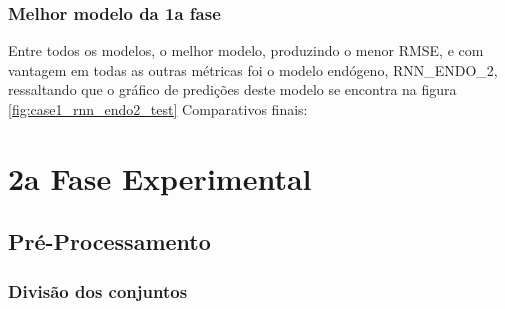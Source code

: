 \documentclass[	12pt, Times, openright, twoside, a4paper, english, brazil]{abntex2}
\begin{document}
    	    \subsubsection{Melhor modelo da 1a fase}
                Entre todos os modelos, o melhor modelo, produzindo o menor RMSE, e com vantagem em todas as outras métricas foi o modelo endógeno, RNN\_ENDO\_2, ressaltando que o gráfico de predições deste modelo se encontra na figura \ref{fig:case1_rnn_endo2_test}
                Comparativos finais:

    \section{2a Fase Experimental}
	    \subsection{Pré-Processamento}
    	    \subsubsection{Divisão dos conjuntos}
    	        \begin{figure}[H]
                \end{figure}
                
                \begin{figure}[H]
                \end{figure}
                
\end{document}
